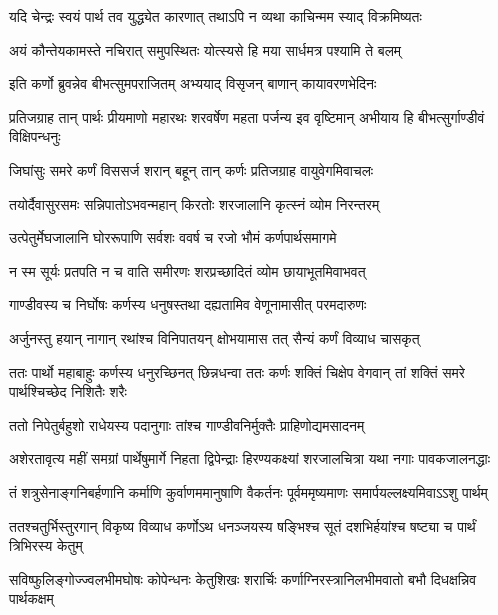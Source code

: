 \twolineshloka
{यदि चेन्द्रः स्वयं पार्थ तव युद्ध्येत कारणात्}
{तथाऽपि न व्यथा काचिन्मम स्याद् विक्रमिष्यतः}


\twolineshloka
{अयं कौन्तेयकामस्ते नचिरात् समुपस्थितः}
{योत्स्यसे हि मया सार्धमत्र पश्यामि ते बलम्}



\twolineshloka
{इति कर्णो ब्रुवन्नेव बीभत्सुमपराजितम्}
{अभ्ययाद् विसृजन् बाणान् कायावरणभेदिनः}


\onelineshloka
{प्रतिजग्राह तान् पार्थः प्रीयमाणो महारथः}
\twolineshloka
{शरवर्षेण महता पर्जन्य इव वृष्टिमान्}
{अभीयाय हि बीभत्सुर्गाण्डीवं विक्षिपन्धनुः}


\twolineshloka
{जिघांसुः समरे कर्णं विससर्ज शरान् बहून्}
{तान् कर्णः प्रतिजग्राह वायुवेगमिवाचलः}


\twolineshloka
{तयोर्दैवासुरसमः सन्निपातोऽभवन्महान्}
{किरतोः शरजालानि कृत्स्नं व्योम निरन्तरम्}


\twolineshloka
{उत्पेतुर्मेघजालानि घोररूपाणि सर्वशः}
{ववर्ष च रजो भौमं कर्णपार्थसमागमे}


\twolineshloka
{न स्म सूर्यः प्रतपति न च वाति समीरणः}
{शरप्रच्छादितं व्योम छायाभूतमिवाभवत्}


\twolineshloka
{गाण्डीवस्य च निर्घोषः कर्णस्य धनुषस्तथा}
{दह्यतामिव वेणूनामासीत् परमदारुणः}


\twolineshloka
{अर्जुनस्तु हयान् नागान् रथांश्च विनिपातयन्}
{क्षोभयामास तत् सैन्यं कर्णं विव्याध चासकृत्}


\threelineshloka
{ततः पार्थो महाबाहुः कर्णस्य धनुरच्छिनत्}
{छिन्नधन्वा ततः कर्णः शक्तिं चिक्षेप वेगवान्}
{तां शक्तिं समरे पार्थश्चिच्छेद निशितैः शरैः}


\twolineshloka
{ततो निपेतुर्बहुशो राधेयस्य पदानुगाः}
{तांश्च गाण्डीवनिर्मुक्तैः प्राहिणोद्यमसादनम्}


\fourlineindentedshloka
{अशेरतावृत्य महीं समग्रां}
{पार्थेषुमार्गे निहता द्विपेन्द्राः}
{हिरण्यकक्ष्यां शरजालचित्रा}
{यथा नगाः पावकजालनद्धाः}


\fourlineindentedshloka
{तं शत्रुसेनाङ्गनिबर्हणानि}
{कर्माणि कुर्वाणममानुषाणि}
{वैकर्तनः पूर्वममृष्यमाणः}
{समार्पयल्लक्ष्यमिवाऽऽशु पार्थम्}


\fourlineindentedshloka
{ततश्चतुर्भिस्तुरगान् विकृष्य}
{विव्याध कर्णोऽथ धनञ्जयस्य}
{षङ्भिश्च सूतं दशभिर्हयांश्च}
{षष्ट्या च पार्थं त्रिभिरस्य केतुम्}


\fourlineindentedshloka
{सविष्फुलिङ्गोज्ज्वलभीमघोषः}
{कोपेन्धनः केतुशिखः शरार्चिः}
{कर्णाग्निरस्त्रानिलभीमवातो}
{बभौ दिधक्षन्निव पार्थकक्षम्}


